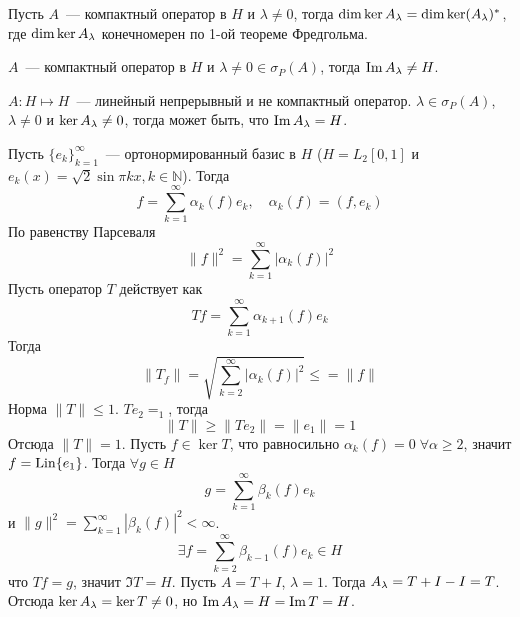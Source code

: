 \documentclass[14pt]{extarticle}
\begin{document}
\begin{Theor}
    Пусть $A$~--- компактный оператор в $H$ и $\lambda \ne 0$, тогда
    $\dim \ker A_\lambda = \dim \ker (A_\lambda)^*$, где $\dim \ker A_\lambda$ конечномерен по 
    1-ой теореме Фредгольма.
\end{Theor}
\begin{Lemm}
    $A$~--- компактный оператор в $H$ и $\lambda \ne 0 \in \sigma_P(A)$, 
    тогда $\operatorname{Im} A_\lambda \ne H$.
\end{Lemm}
\begin{Prim}
    $A : H \mapsto H$~--- линейный непрерывный и не компактный оператор.
    $\lambda \in \sigma_P(A)$, $\lambda \ne 0$ и $\ker A_\lambda \ne 0$, тогда может
    быть, что $\operatorname{Im} A_\lambda = H$.
    
    Пусть $\{e_k\}_{ k = 1}^\infty$~--- ортонормированный базис в $H$ ($H =
    L_2[0,1]$ и $e_k(x) = \sqrt{2}\sin \pi k x,k \in \mathbb{N}$).
    Тогда 
    $$
    f = \sum\limits_{k = 1}^\infty \alpha_k(f) e_k,\quad \alpha_k(f) = (f,
    e_k)
    $$
    По равенству Парсеваля
    $$
    \|f\|^2 = \sum\limits_{k = 1}^\infty |\alpha_k(f)|^2
    $$
    Пусть оператор $T$ действует как
    $$
    Tf = \sum\limits_{k = 1}^\infty \alpha_{k + 1}(f)e_k
    $$
    Тогда
    $$
    \|T_f\| = \sqrt{\sum\limits_{k = 2}^\infty |\alpha_k(f)|^2} \le = \|f\|
    $$
    Норма $\|T\| \le 1$.
    $T e_2 = _1$, тогда
    $$
    \|T\| \ge \|T e_2\| = \|e_1\| = 1
    $$
    Отсюда $\|T\| = 1$.
    Пусть $f \in \ker T$, что равносильно $\alpha_k(f) = 0\;\forall \alpha \ge 
    2$, значит $f = \operatorname{Lin}\{e_1\}$.
    Тогда $\forall g \in H$
    $$
    g = \sum\limits_{k = 1}^\infty \beta_k(f) e_k
    $$
    и $\|g\|^2 = \sum\limits_{k = 1}^\infty |\beta_k(f)|^2 < \infty$.
    $$
    \exists f = \sum\limits_{k = 2}^\infty \beta_{k - 1}(f)e_k \in H
    $$
    что $Tf = g$, значит $\Im T = H$.
    Пусть $A = T + I$, $\lambda = 1$.
    Тогда $A_\lambda = T + I - I = T$.
    Отсюда $\ker A_\lambda = \ker T \ne 0$, но $\operatorname{Im} A_\lambda = H = \operatorname{Im} T = H$.
\end{Prim}
\end{document}

